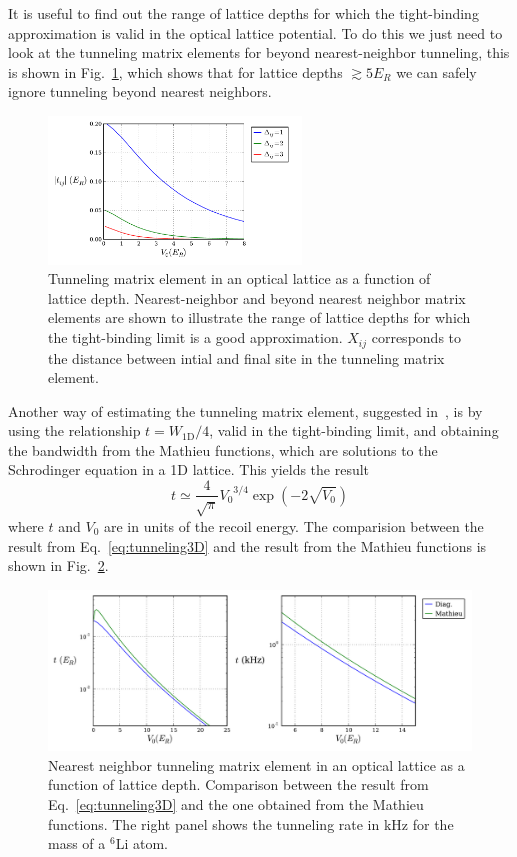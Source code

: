 \documentclass[11pt,letter]{article}
\newcommand{\vo}{\ensuremath{V_{0}}}
\begin{document}
It is useful to find out the range of lattice depths for which the
tight-binding approximation is valid in the optical lattice potential.  To do
this we just need to look at the tunneling matrix elements for beyond
nearest-neighbor tunneling,  this is shown in Fig.~\ref{fig:tightbinding},
which shows that for lattice depths $\gtrsim 5 E_{R}$  we can safely ignore
tunneling beyond nearest neighbors.  
\begin{figure}
\centering \includegraphics[width=0.6\textwidth]{../BandStructure_figures/tightbinding_V0_interp.pdf}
\caption[Tunneling matrix elements in a 3D lattice.]{\small Tunneling matrix
element in an optical lattice as a function of lattice depth.  Nearest-neighbor
and beyond nearest neighbor matrix elements are shown to illustrate the range
of lattice depths for which the tight-binding limit is a good approximation.
$X_{ij}$ corresponds to the distance between intial and final site in the
tunneling matrix element. 
 } \label{fig:tightbinding}
\end{figure}

Another way of estimating the tunneling matrix element, suggested
in~\cite{Bloch2008}, is by using the relationship $t=W_{\text{1D}}/4$, valid in
the tight-binding limit,  and obtaining the bandwidth from the Mathieu
functions, which are solutions to the Schrodinger equation in a 1D lattice.
This yields the result 
\begin{equation}
 t \simeq \frac{4}{\sqrt{\pi}} \vo^{3/4} \exp(-2\sqrt{\vo}) 
\end{equation} 
where $t$ and $\vo$ are in units of the recoil energy.   The comparision
between the result from Eq.~\ref{eq:tunneling3D} and the  result from the
Mathieu functions is shown in Fig.~\ref{fig:tMathieu}. 
\begin{figure}
\centering \includegraphics[width=\textwidth]{../BandStructure_figures/tunneling_V0_Mathieu.pdf}
\caption[Nearest neighbor tunneling matrix element]{\small Nearest neighbor
tunneling matrix element in an optical lattice as a function of lattice depth.
Comparison between the result from Eq.~\ref{eq:tunneling3D} and the one
obtained from the Mathieu functions.  The right panel shows the tunneling rate
in kHz for the mass of a $^{6}$Li atom.  } \label{fig:tMathieu}
\end{figure}
\end{document}
